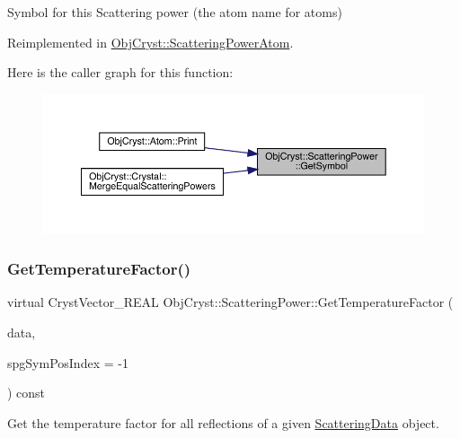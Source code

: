 Symbol for this Scattering power (the atom name for atoms) 



Reimplemented in \mbox{\hyperlink{class_obj_cryst_1_1_scattering_power_atom_a203ad8709ec6b88b43317a5d295e20c2}{Obj\+Cryst\+::\+Scattering\+Power\+Atom}}.

Here is the caller graph for this function\+:
\nopagebreak
\begin{figure}[H]
\begin{center}
\leavevmode
\includegraphics[width=350pt]{class_obj_cryst_1_1_scattering_power_afc2a98469a75c58259d4f81cd30510b9_icgraph}
\end{center}
\end{figure}
\mbox{\label{class_obj_cryst_1_1_scattering_power_a3df723db77380c82ecff5f7050490255}} 
\subsubsection{\texorpdfstring{GetTemperatureFactor()}{GetTemperatureFactor()}}
{\footnotesize\ttfamily virtual Cryst\+Vector\+\_\+\+R\+E\+AL Obj\+Cryst\+::\+Scattering\+Power\+::\+Get\+Temperature\+Factor (\begin{DoxyParamCaption}\item[{const \mbox{\hyperlink{class_obj_cryst_1_1_scattering_data}{Scattering\+Data}} \&}]{data,  }\item[{const int}]{spg\+Sym\+Pos\+Index = {\ttfamily -\/1} }\end{DoxyParamCaption}) const\hspace{0.3cm}{\ttfamily [pure virtual]}}



Get the temperature factor for all reflections of a given \mbox{\hyperlink{class_obj_cryst_1_1_scattering_data}{Scattering\+Data}} object. 

